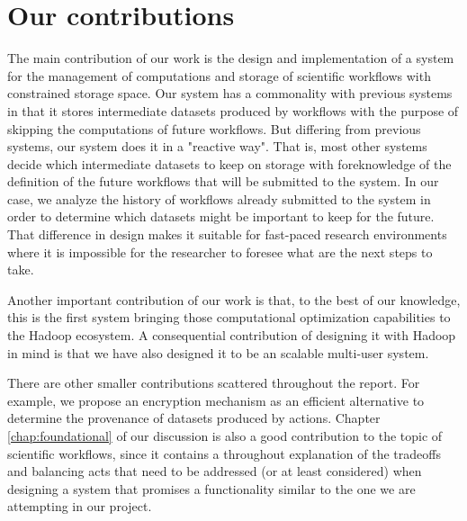 \section{Our contributions}
The main contribution of our work is the design and implementation of a system for the management of computations and storage of scientific workflows with constrained storage space. Our system has a commonality with previous systems in that it stores intermediate datasets produced by workflows with the purpose of skipping the computations of future workflows. But differing from previous systems, our system does it in a "reactive way".  That is, most other systems decide which intermediate datasets to keep on storage with foreknowledge of the definition of the future workflows that will be submitted to the system.  In our case, we analyze the history of workflows already submitted to the system in order to determine which datasets might be important to keep for the future. That difference in design makes it suitable for fast-paced research environments where it is impossible for the researcher to foresee what are the next steps to take.

Another important contribution of our work is that, to the best of our knowledge, this is the first system bringing those computational optimization capabilities to the Hadoop ecosystem.  A consequential contribution of designing it with Hadoop in mind is that we have also designed it to be an scalable multi-user system.

There are other smaller contributions scattered throughout the report. For example, we propose an encryption mechanism as an efficient alternative to determine the provenance of datasets produced by actions.  Chapter \ref{chap:foundational} of our discussion is also a good contribution to the topic of scientific workflows, since it contains a throughout explanation of the tradeoffs and balancing acts that need to be addressed (or at least considered) when designing a system that promises a functionality similar to the one we are attempting in our project. 